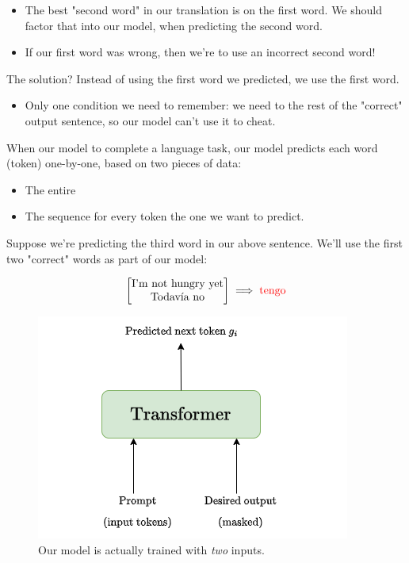         \begin{itemize}
            \item The best "second word" in our translation is  on the first word. We should factor that into our model, when predicting the second word.

            \item If our first word was wrong, then we're  to use an incorrect second word!
        \end{itemize}

        The solution? Instead of using the first word we predicted, we use the  first word.

        \begin{itemize}
            \item Only one condition we need to remember: we need to  the rest of the "correct" output sentence, so our model can't use it to cheat.\\
        \end{itemize}

        \begin{concept}
            When  our model to complete a language task, our model predicts each word (token) one-by-one, based on two pieces of data:

            \begin{itemize}
                \item The entire 
                \item The  sequence for every token  the one we want to predict.
            \end{itemize}
        \end{concept}

        \miniex Suppose we're predicting the third word in our above sentence. We'll use the first two "correct" words as part of our model:

        $$\begin{bmatrix}
            \text{I'm not hungry yet} \\
            \text{Todavía no}
        \end{bmatrix}
        \implies
        \text{\textcolor{red}{tengo}}$$

        \begin{figure}[H]
            \centering
            \includegraphics[width=0.35\linewidth]{images/transformers_images/text_prediction.png}
            \caption*{Our model is actually trained with \textit{two} inputs.}
        \end{figure}


